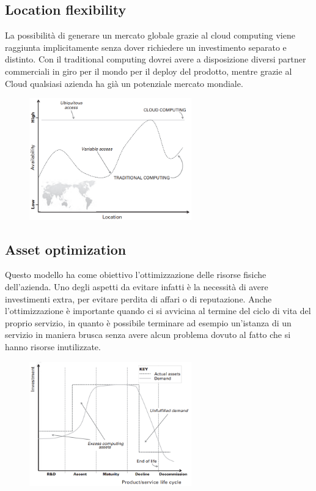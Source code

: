 \subsection{Location flexibility}
La possibilità di generare un mercato globale grazie al cloud computing viene raggiunta implicitamente senza dover richiedere un investimento separato e distinto. Con il traditional computing dovrei avere a disposizione diversi partner commerciali in giro per il mondo per il deploy del prodotto, mentre grazie al Cloud qualsiasi azienda ha già un potenziale mercato mondiale.
\clearpage
\begin{figure}[htb!]
    \centering
    \includegraphics[width=7cm]{./Images/cap6/6.8.png}
\end{figure}

\subsection{Asset optimization}
Questo modello ha come obiettivo l'ottimizzazione delle risorse fisiche dell'azienda. Uno degli aspetti da evitare infatti è la necessità di avere investimenti extra, per evitare perdita di affari o di reputazione. Anche l'ottimizzazione è importante quando ci si avvicina al termine del ciclo di vita del proprio servizio, in quanto è possibile terminare ad esempio un'istanza di un servizio in maniera brusca senza avere alcun problema dovuto al fatto che si hanno risorse inutilizzate.

\begin{figure}[htb!]
    \centering
    \includegraphics[width=7cm]{./Images/cap6/6.9.png}
\end{figure}

